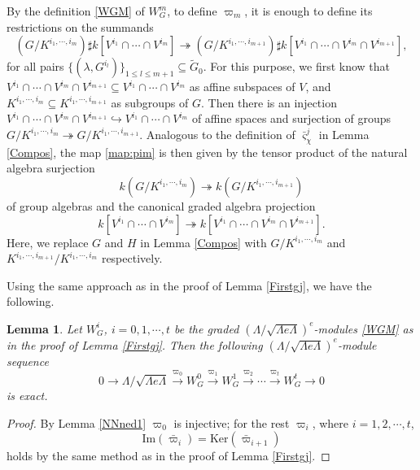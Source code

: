 \documentclass[11pt,reqno]{amsart}
\newtheorem{lemma}[theorem]{Lemma}
\theoremstyle{definition}
\begin{document}
By the definition
\eqref{WGM}
of $W_G^m$, to define 
$\varpi_{m}$, it is enough to define
its restrictions on the summands 
\begin{equation}
\label{map:pim}
(G / K^{i_1, \cdots, i_m} 
)\sharp k[V^{i_1} \cap 
\cdots \cap V^{i_m}] \twoheadrightarrow  
(G / K^{i_1, \cdots, i_{m+1}} )\sharp 
k[V^{i_1} \cap \cdots \cap V^{i_m} \cap 
V^{i_{m+1}}],
\end{equation}
for all pairs 
$\{(\lambda, G^{i_l})\}_{1 \leq l \leq m+1} \subseteq \tilde{G}_0$. 
For this purpose, we first know that
$V^{i_1} \cap \cdots \cap V^{i_m} 
\cap V^{i_{m+1}} \subseteq V^{i_1} \cap \cdots  \cap V^{i_m}$ as affine subspaces of $V$, and
$K^{i_1, \cdots, i_{m}} \subseteq K^{i_1, \cdots, i_{m+1}}$
as subgroups of $G$. 
Then there is an injection $V^{i_1} \cap \cdots \cap V^{i_m} 
\cap V^{i_{m+1}} \hookrightarrow V^{i_1} \cap \cdots  \cap V^{i_m}$ of affine spaces and surjection of groups
$G / K^{i_1, \cdots, i_m} \twoheadrightarrow G / K^{i_1, \cdots, i_{m+1}}$. 
Analogous to the definition of $\bar\varsigma^j_{\chi}$ in Lemma \ref{Compos}, 
the map \eqref{map:pim}
is then given by the tensor product
of
the natural algebra surjection 
$$k( G / K^{i_1, \cdots, i_m}) \twoheadrightarrow k(G / K^{i_1, \cdots, i_{m+1}})$$ 
of group algebras
and the canonical graded algebra projection 
$$k[V^{i_1} \cap \cdots \cap V^{i_m}] \twoheadrightarrow k[V^{i_1} \cap \cdots \cap V^{i_m} 
\cap V^{i_{m+1}}].$$ 
Here, we replace $G$ and $H$ in 
Lemma \ref{Compos} with 
$G/ K^{i_1, \cdots, i_m}$ 
and $K^{i_1, 
\cdots, i_{m+1}} / K^{i_1, \cdots, i_m}$ respectively.


Using the same approach as 
in the proof of Lemma \ref{Firstgj}, we have the following.  

\begin{lemma}\label{qjsgkn}
Let $W_G^i$, $i=0, 1,\cdots, t$
be the
graded $(\Lambda/\sqrt{ \Lambda e \Lambda})^e$-modules \eqref{WGM}
as in the proof
of Lemma \ref{Firstgj}. 
Then the following  $(\Lambda/ \sqrt{\Lambda e \Lambda})^e$-module sequence 
$$
0 \longrightarrow \Lambda/ \sqrt{\Lambda e \Lambda}\xrightarrow{\varpi_{0}} W_G^0 
\xrightarrow{\varpi_{1}} W_G^1 \xrightarrow{\varpi_{2}}   \cdots   \xrightarrow{\varpi_{t}}     
W_G^t \longrightarrow 0
$$
is exact. 
\end{lemma}

\begin{proof}
By Lemma \ref{NNned1}
$\varpi_0$ is injective;
for the rest $\varpi_i$, where
$i=1,2,\cdots, t$,
$$
\mathrm{Im}(\bar{\varpi}_i) 
= \mathrm{Ker}(\bar{\varpi}_{i+1})
$$
holds by 
the same method as in the proof of Lemma \ref{Firstgj}. 
\end{proof}
\end{document}
